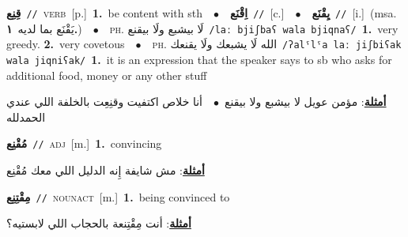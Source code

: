 \documentclass[10pt,a4paper,twoside]{article} %
\begin{document}
\begin{multicols}{2}
{\setlength\topsep{0pt}\textbf{\foreignlanguage{arabic}{قِنِع}}\ {\color{gray}\texttt{//}\color{black}}\ \textsc{verb}\ [p.]\ \textbf{1.}~be content with sth\ \ $\bullet$\ \ \setlength\topsep{0pt}\textbf{\foreignlanguage{arabic}{اِقْنَع}}\ {\color{gray}\texttt{//}\color{black}}\ [c.]\ \ $\bullet$\ \ \setlength\topsep{0pt}\textbf{\foreignlanguage{arabic}{يِقْنَع}}\ {\color{gray}\texttt{//}\color{black}}\ [i.]\ \color{gray}(msa. \foreignlanguage{arabic}{يَقْنَع بما لديه}~\foreignlanguage{arabic}{\textbf{١.}})\color{black}\ \ $\bullet$\ \ \textsc{ph.} \color{gray} \foreignlanguage{arabic}{لَا بيشبع ولَا بيقنع}\color{black}\ {\color{gray}\texttt{/{\sffamily laː bjiʃbaʕ wala bjiqnaʕ}/}\color{black}}\ \textbf{1.}~very greedy.  \textbf{2.}~very covetous\ \ $\bullet$\ \ \textsc{ph.} \color{gray} \foreignlanguage{arabic}{الله لَا يشبعك ولَا يقنعك}\color{black}\ {\color{gray}\texttt{/{\sffamily ʔalˤlˤa laː jiʃbiʕak wala jiqniʕak}/}\color{black}}\ \textbf{1.}~it is an expression that the speaker says to sb who asks for additional food, money or any other stuff\  \begin{flushright}\color{gray}\foreignlanguage{arabic}{\textbf{\underline{\foreignlanguage{arabic}{أمثلة}}}: مؤمن عويل لا بيشبع ولا بيقنع\ $\bullet$\ \  أنا خلاص اكتفيت وقنِعِت بالخلفة اللي عندي الحمدلله}\end{flushright}\color{black}} \vspace{2mm}

{\setlength\topsep{0pt}\textbf{\foreignlanguage{arabic}{مُقْنِع}}\ {\color{gray}\texttt{//}\color{black}}\ \textsc{adj}\ [m.]\ \textbf{1.}~convincing\  \begin{flushright}\color{gray}\foreignlanguage{arabic}{\textbf{\underline{\foreignlanguage{arabic}{أمثلة}}}: مش شايفة إِنه الدليل اللي معك مُقْنِع}\end{flushright}\color{black}} \vspace{2mm}

{\setlength\topsep{0pt}\textbf{\foreignlanguage{arabic}{مِقْتِنِع}}\ {\color{gray}\texttt{//}\color{black}}\ \textsc{noun\textunderscore act}\ [m.]\ \textbf{1.}~being convinced to\  \begin{flushright}\color{gray}\foreignlanguage{arabic}{\textbf{\underline{\foreignlanguage{arabic}{أمثلة}}}: أنت مِقْتِنعة بالحجاب اللي لابستيه؟}\end{flushright}\color{black}} \vspace{2mm}


\end{multicols}
\end{document}
